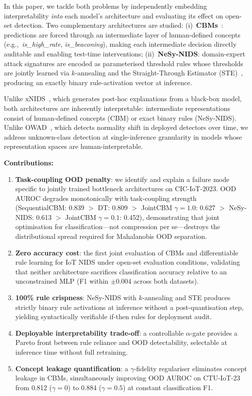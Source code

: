 \documentclass[journal]{IEEEtran}
\begin{document}
In this paper, we tackle both problems by independently embedding
interpretability \emph{into} each model's architecture and evaluating
its effect on open-set detection. Two complementary architectures are
studied: (i)~\textbf{CBMs}~\cite{koh2020concept}: predictions are
forced through an intermediate layer of human-defined concepts
(e.g.,\ \textit{is\_high\_rate}, \textit{is\_beaconing}), making each
intermediate decision directly auditable and enabling test-time
interventions; (ii)~\textbf{NeSy-NIDS}: domain-expert attack
signatures are encoded as parameterised threshold rules whose
thresholds are jointly learned via $k$-annealing and the
Straight-Through Estimator (STE)~\cite{bengio2013ste,liu2023reinmax},
producing an exactly binary rule-activation vector at inference.

Unlike xNIDS~\cite{wei2023xnids}, which generates post-hoc
explanations from a black-box model, both architectures are inherently
interpretable: intermediate representations consist of human-defined
concepts (CBM) or exact binary rules (NeSy-NIDS). Unlike
OWAD~\cite{han2023owad}, which detects normality shift in deployed
detectors over time, we address unknown-class detection at
single-inference granularity in models whose representation spaces are
human-interpretable.

\smallskip
\noindent\textbf{Contributions:}
\begin{enumerate}
  \item \textbf{Task-coupling OOD penalty}: we identify and explain a
    failure mode specific to jointly trained bottleneck architectures on
    CIC-IoT-2023. OOD AUROC degrades monotonically with task-coupling
    strength (SequentialCBM: 0.839 $>$ DT: 0.809 $>$ JointCBM
    $\gamma{=}1.0$: 0.627 $>$ NeSy-NIDS: 0.613 $>$ JointCBM
    $\gamma{=}0.1$: 0.452), demonstrating that joint optimisation for
    classification---not compression per se---destroys the distributional
    spread required for Mahalanobis OOD separation.
  \item \textbf{Zero accuracy cost}: the first joint evaluation of CBMs
    and differentiable rule learning for IoT NIDS under open-set
    evaluation conditions, validating that neither architecture
    sacrifices classification accuracy relative to an unconstrained MLP
    (F1 within $\pm0.004$ across both datasets).
  \item \textbf{100\% rule crispness}: NeSy-NIDS with $k$-annealing
    and STE produces strictly binary rule activations at inference
    without a post-quantisation step, yielding syntactically
    verifiable if-then rules for deployment audit.
  \item \textbf{Deployable interpretability trade-off}: a controllable
    $\alpha$-gate provides a Pareto front between rule reliance and
    OOD detectability, selectable at inference time without full
    retraining.
  \item \textbf{Concept leakage quantification}: a $\gamma$-fidelity
    regulariser eliminates concept leakage in CBMs, simultaneously
    improving OOD AUROC on CTU-IoT-23 from 0.812 ($\gamma{=}0$) to
    0.884 ($\gamma{=}0.5$) at constant classification F1.
\end{enumerate}
\end{document}

